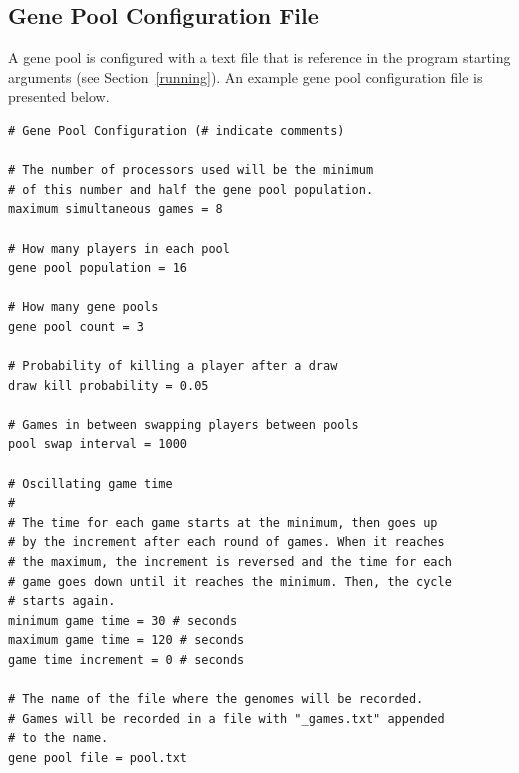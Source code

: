 \documentclass[letterpaper]{article}
\renewcommand{\_}{\allowbreak\textunderscore\allowbreak}
\begin{document}
\subsection{Gene Pool Configuration File}
A gene pool is configured with a text file that is reference in the program starting arguments (see Section~\ref{running}). An example gene pool configuration file is presented below.
\begin{verbatim}
# Gene Pool Configuration (# indicate comments)

# The number of processors used will be the minimum
# of this number and half the gene pool population.
maximum simultaneous games = 8

# How many players in each pool
gene pool population = 16

# How many gene pools
gene pool count = 3

# Probability of killing a player after a draw
draw kill probability = 0.05

# Games in between swapping players between pools
pool swap interval = 1000

# Oscillating game time
#
# The time for each game starts at the minimum, then goes up
# by the increment after each round of games. When it reaches
# the maximum, the increment is reversed and the time for each
# game goes down until it reaches the minimum. Then, the cycle
# starts again.
minimum game time = 30 # seconds
maximum game time = 120 # seconds
game time increment = 0 # seconds

# The name of the file where the genomes will be recorded.
# Games will be recorded in a file with "_games.txt" appended
# to the name.
gene pool file = pool.txt
\end{verbatim}
\end{document}

